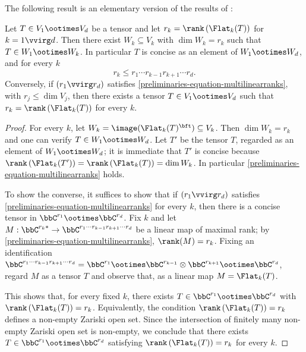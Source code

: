 The following result is an elementary version of the results of \cite{CK11}:
\begin{lemma}
\label{preliminaries-lemma-multilinearranksineq}
 Let $T \in V_1 \ootimes V_d$ be a tensor and let $r_k = \rank \left( \Flat_k(T) \right)$ for $k=1 \vvirg d$. Then there exist $W_k \subseteq V_k$ with $\dim W_k = r_k$ such that $T \in W_1 \ootimes W_k$. In particular $T$ is concise as an element of $W_1 \ootimes W_d$, and for every $k$
 \begin{equation}
  \label{preliminaries-equation-multilinearranks}
 r_k \leq r_1 \cdots r_{k-1} r_{k+1} \cdots r_d.
 \end{equation}
Conversely, if $(r_1 \vvirg r_d)$ satisfies \ref{preliminaries-equation-multilinearranks}, with $r_j \leq \dim V_j$, then there exists a tensor $T \in V_1 \ootimes V_d$ such that $r_k = \rank \left( \Flat_k(T) \right)$ for every $k$.
\end{lemma}
\begin{proof}
For every $k$, let $W_k = \image (  \Flat_k(T)^\bft ) \subseteq V_k$. Then $\dim W_k = r_k$ and one can verify $T \in W_1 \ootimes W_d$. Let $T'$ be the tensor $T$, regarded as an element of $W_1 \ootimes W_d$; it is immediate that $T'$ is concise because $\rank \left( \Flat_k(T') \right) = \rank \left( \Flat_k(T) \right) = \dim W_k$. In particular \ref{preliminaries-equation-multilinearranks} holds.

To show the converse, it suffices to show that if $(r_1 \vvirg r_d)$ satisfies \ref{preliminaries-equation-multilinearranks} for every $k$, then there is a concise tensor in $\bbC^{r_1} \ootimes \bbC^{r_d}$. Fix $k$ and let $M : \bbC^{r_k *} \to \bbC^{r_1 \cdots r_{k-1}r_{k+1} \cdots r_d}$ be a linear map of maximal rank; by \ref{preliminaries-equation-multilinearranks}, $\rank(M) = r_k$. Fixing an identification $\bbC^{r_1 \cdots r_{k-1}r_{k+1} \cdots r_d} = \bbC^{r_1} \ootimes \bbC^{r_{k-1}} \otimes \bbC^{r_{k+1}} \ootimes \bbC^{r_d}$, regard $M$ as a tensor $T$ and observe that, as a linear map $M = \Flat_k(T)$.

This shows that, for every fixed $k$, there exists $T \in \bbC^{r_1} \ootimes \bbC^{r_d}$ with $\rank \left( \Flat_k(T) \right) = r_k$. Equivalently, the condition $\rank \left( \Flat_k(T) \right) = r_k$ defines a non-empty Zariski open set. Since the intersection of finitely many non-empty Zariski open set is non-empty, we conclude that there exists $T \in \bbC^{r_1} \ootimes \bbC^{r_d}$ satisfying $\rank \left( \Flat_k(T) \right) = r_k$ for every $k$. 
\end{proof}

